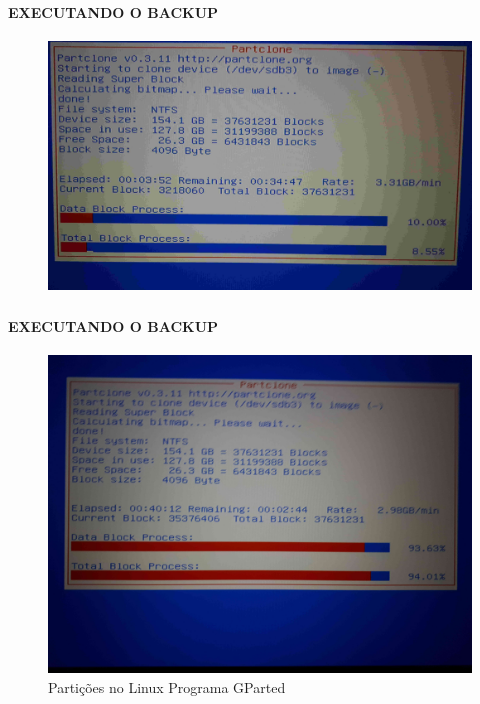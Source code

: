 \documentclass{beamer}
\begin{document}
\begin{frame}[plain,c]
   \frametitle{\insertsection}
    \framesubtitle{EXECUTANDO O BACKUP}
    \begin{figure}[!h]
        \includegraphics[width=1.1\linewidth]{images/backup/bkp26.jpg}
    \end{figure}
\end{frame}

\begin{frame}[plain,c]
   \frametitle{\insertsection}
    \framesubtitle{EXECUTANDO O BACKUP}
    \begin{figure}[!h]
        \includegraphics[width=1\linewidth]{images/backup/bkp27.jpg}
        \caption{Partições no Linux Programa GParted}
    \end{figure}
\end{frame}	
\end{document}
